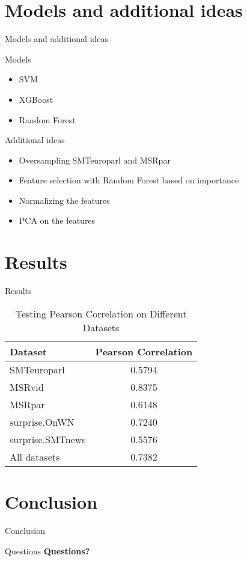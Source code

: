 \documentclass{beamer}
\begin{document}
\section{Models and additional ideas}
\begin{frame}{Models and additional ideas}
    \begin{block}{Models}
        \begin{itemize}
            \item SVM
            \item XGBoost
            \item Random Forest
        \end{itemize}
    \end{block}

    \begin{block}{Additional ideas}
        \begin{itemize}
            \item Oversampling SMTeuroparl and MSRpar
            \item Feature selection with Random Forest based on importance
            \item Normalizing the features
            \item PCA on the features
        \end{itemize}
    \end{block}
\end{frame}

\section{Results}

\begin{frame}{Results}
    \begin{table}[h]
        \centering
        \begin{tabular}{|l|c|}
            \hline
            \textbf{Dataset} & \textbf{Pearson Correlation} \\ \hline
            SMTeuroparl & 0.5794 \\ \hline
            MSRvid & 0.8375 \\ \hline
            MSRpar & 0.6148 \\ \hline
            surprise.OnWN & 0.7240 \\ \hline
            surprise.SMTnews & 0.5576 \\ \hline
            All datasets & 0.7382 \\ \hline
        \end{tabular}
        \caption{Testing Pearson Correlation on Different Datasets}
        \label{tab:pearson-correlation}
    \end{table}  
\end{frame}

\section{Conclusion}

\begin{frame}{Conclusion}
    \begin{itemize}
    \end{itemize}
\end{frame}

\begin{frame}{Questions}
    \centering
    {\Huge \textbf{Questions?}}
\end{frame}
\end{document}
